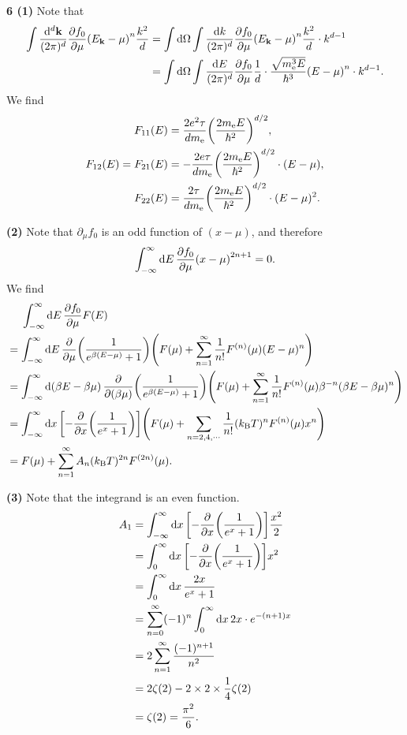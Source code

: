 \documentclass{article}
\makeatletter
\newcommand*{\shifttext}[1]{%
  \settowidth{\@tempdima}{#1}%
  \hspace{-\@tempdima}#1%
}
\newcommand{\plabel}[1]{%
\shifttext{\textbf{#1}\quad}%
}
\newcommand{\prule}{%
\begin{center}%
\hdashrule[0.5ex]{.99\linewidth}{1pt}{1pt 2.5pt}%
\end{center}%
}
\makeatother
\begin{document}
\prule

\plabel{6 (1)}%
Note that
\begin{align*}
  \int \frac{\dd[d]{\vb{k}}}{(2\pi)^d} \pdv{f_0}{\mu} \qty(E_{\vb{k}} - \mu)^n \frac{k^2}{d} &= \int \dd{\Omega} \int \frac{\dd{k}}{(2\pi)^d} \pdv{f_0}{\mu} \qty(E_{\vb{k}} - \mu)^n \frac{k^2}{d} \cdot k^{d-1} \\
  &= \int \dd{\Omega} \int \frac{\dd{E}}{(2\pi)^d} \pdv{f_0}{\mu} \frac{1}{d} \cdot \frac{\sqrt{m_{\mathrm{e}}^3 E}}{\hbar^3} \qty(E - \mu)^n \cdot k^{d-1}.
\end{align*}
We find
\begin{align*}
  F_{11}(E) &= \frac{2e^2 \tau}{d m_{\mathrm{e}}} \qty(\frac{2m_{\mathrm{e}} E}{\hbar^2})^{d/2}, \\
  F_{12}(E) = F_{21}(E) &= -\frac{2e \tau}{d m_{\mathrm{e}}} \qty(\frac{2 m_{\mathrm{e}} E}{\hbar^2})^{d/2} \cdot (E - \mu), \\
  F_{22}(E) &= \frac{2\tau}{d m_{\mathrm{e}}} \qty(\frac{2m_{\mathrm{e}} E}{\hbar^2})^{d/2} \cdot (E - \mu)^2.
\end{align*}

\plabel{(2)}%
Note that $\partial_\mu f_0$ is an odd function of $(x-\mu)$, and therefore
\[ \int_{-\infty}^\infty \dd{E} \pdv{f_0}{\mu} \qty(x-\mu)^{2n+1} = 0. \]
We find
\begin{align*}
  &{\phantom{{}={}}} \int_{-\infty}^\infty \dd{E} \pdv{f_0}{\mu} F(E) \\
  &= \int_{-\infty}^\infty \dd{E} \pdv{}{\mu} \qty(\frac{1}{e^{\beta(E - \mu)} + 1}) \qty(F(\mu) + \sum_{n=1}^\infty \frac{1}{n!} F^{(n)}(\mu) (E - \mu)^n) \\
  &= \int_{-\infty}^\infty \dd{(\beta E - \beta \mu)} \pdv{}{(\beta \mu)} \qty(\frac{1}{e^{\beta(E - \mu)} + 1}) \qty(F(\mu) + \sum_{n=1}^\infty \frac{1}{n!} F^{(n)}(\mu) \beta^{-n} (\beta E - \beta \mu)^n) \\
  &= \int_{-\infty}^\infty \dd{x} \qty[-\pdv{}{x}\qty(\frac{1}{e^x + 1})] \qty(F(\mu) + \sum_{n=2,4,\cdots} \frac{1}{n!} (k_{\mathrm{B}}T)^n F^{(n)}(\mu)x^n) \\
  &= F(\mu) + \sum_{n=1}^\infty A_n (k_{\mathrm{B}} T)^{2n} F^{(2n)}(\mu).
\end{align*}

\plabel{(3)}%
Note that the integrand is an even function.
\begin{align*}
  A_1 &= \int_{-\infty}^\infty \dd{x} \qty[-\pdv{}{x}\qty(\frac{1}{e^x + 1})]\frac{x^2}{2} \\
  &= \int_{0}^\infty \dd{x} \qty[-\pdv{}{x}\qty(\frac{1}{e^x + 1})] x^2 \\
  &= \int_0^\infty \dd{x} \frac{2x}{e^x+1} \\
  &= \sum_{n=0}^\infty (-1)^n \int_0^\infty \dd{x} 2x \cdot e^{-(n+1) x} \\
  &= 2 \sum_{n=1}^\infty \frac{(-1)^{n+1}}{n^2} \\
  &= 2\zeta(2) - 2\times 2\times \frac{1}{4}\zeta(2) \\
  &= \zeta(2) = \frac{\pi^2}{6}.
\end{align*}
\end{document}

